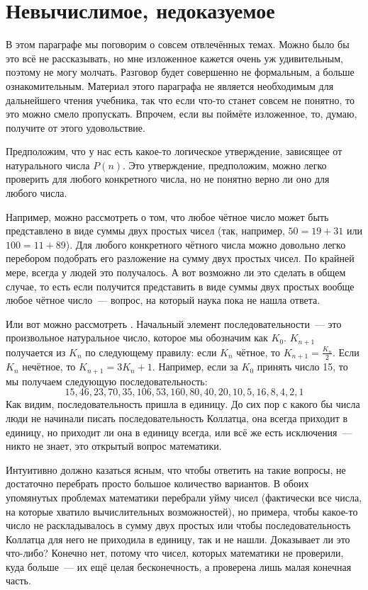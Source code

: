 \section{Невычислимое, недоказуемое}

В этом параграфе мы поговорим о совсем отвлечённых темах. Можно было бы это всё не рассказывать, но мне изложенное кажется очень уж удивительным, поэтому не могу молчать. Разговор будет совершенно не формальным, а больше ознакомительным. Материал этого параграфа не является необходимым для дальнейшего чтения учебника, так что если что-то станет совсем не понятно, то это можно смело пропускать. Впрочем, если вы поймёте изложенное, то, думаю, получите от этого удовольствие.

Предположим, что у нас есть какое-то логическое утверждение, зависящее от натурального числа $P(n)$. Это утверждение, предположим, можно легко проверить для любого конкретного числа, но не понятно верно ли оно для любого числа.

Например, можно рассмотреть  о том, что любое чётное число может быть представлено в виде суммы двух простых чисел (так, например, $50=19+31$ или $100=11+89$). Для любого конкретного чётного числа можно довольно легко перебором подобрать его разложение на сумму двух простых чисел. По крайней мере, всегда у людей это получалось. А вот возможно ли это сделать в общем случае, то есть если получится представить в виде суммы двух простых вообще любое чётное число~--- вопрос, на который наука пока не нашла ответа.

Или вот можно рассмотреть . Начальный элемент последовательности~--- это произвольное натуральное число, которое мы обозначим как $K_0$. $K_{n+1}$ получается из $K_n$ по следующему правилу: если $K_n$ чётное, то $K_{n+1}=\frac{K_n}{2}$. Если $K_n$ нечётное, то $K_{n+1} = 3K_n  + 1$. Например, если за $K_0$ принять число 15, то мы получаем следующую последовательность:
$$15, 46, 23, 70, 35, 106, 53, 160, 80, 40, 20, 10, 5, 16, 8, 4, 2, 1$$
Как видим, последовательность пришла в единицу. До сих пор с какого бы числа люди не начинали писать последовательность Коллатца, она всегда приходит в единицу, но приходит ли она в единицу всегда, или всё же есть исключения~--- никто не знает, это открытый вопрос математики.

Интуитивно должно казаться ясным, что чтобы ответить на такие вопросы, не достаточно перебрать просто большое количество вариантов. В обоих упомянутых проблемах математики перебрали уйму чисел (фактически все числа, на которые хватило вычислительных возможностей), но примера, чтобы какое-то число не раскладывалось в сумму двух простых или чтобы последовательность Коллатца для него не приходила в единицу, так и не нашли. Доказывает ли это что-либо? Конечно нет, потому что чисел, которых математики не проверили, куда больше~--- их ещё целая бесконечность, а проверена лишь малая конечная часть.

